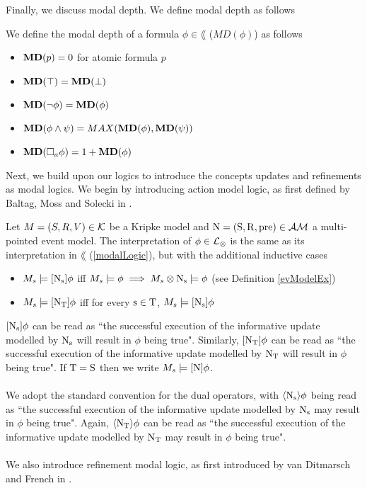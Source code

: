 Finally, we discuss modal depth.
We define modal depth as follows
\begin{defn} \label{modalDepth}
We define the modal depth of a formula $\phi \in \lang$ ($MD(\phi)$) as follows
\begin{itemize}
	\item ${\bf MD}(p) = 0$ for atomic formula $p$
	\item ${\bf MD}(\top) = {\bf MD}(\bot)$
	\item ${\bf MD}(\neg \phi) = {\bf MD}(\phi)$
	\item ${\bf MD}(\phi \land \psi) = MAX({\bf MD}(\phi), {\bf MD}(\psi))$
	\item ${\bf MD}(\Box_a \phi) = 1 + {\bf MD}(\phi)$
\end{itemize}
\end{defn}

Next, we build upon our logics to introduce the concepts updates and refinements as modal logics.
We begin by introducing action model logic, as first defined by Baltag, Moss and Solecki in
\cite{baltag1998lpa}.

\begin{defn} \label{actModelLogic}
Let $M = (S, R, V) \in \mathcal{K}$ be a Kripke model and $ \mathrm{N
  = (S, R, pre)}  \in
\mathcal{AM}$ a multi-pointed event model.
The interpretation of $\phi \in \mathcal{L}_{\otimes}$ is the same as its interpretation in $\lang$
(\ref{modalLogic}), but with the additional
inductive cases
\begin{itemize}
	\item $M_s \models [{ \mathrm{N_s} }] \phi$ iff $M_s \models
  \phi \implies M_s \otimes  \mathrm{N_s}  \models
	\phi$ (see Definition \ref{evModelEx})
	\item $M_s \models [{ \mathrm{N_T} }] \phi$ iff for every $ \mathrm{s
    \in T} $, $M_s \models [{ \mathrm{N_s} }] \phi$ 
\end{itemize}
\end{defn}
$[{ \mathrm{N_s} }] \phi$ can be read as ``the successful execution of the informative update modelled by
$ \mathrm{N_s} $ will result in $\phi$ being true".
Similarly, $[{ \mathrm{N_T} }] \phi$ can be read as ``the successful execution of the informative update
modelled by $ \mathrm{N_T} $ will result in $\phi$ being true".
If $ \mathrm{T = S} $ then we write $M_s \models [{ \mathrm{N} }] \phi$.\\
\\
We adopt the standard convention for the dual operators, with $\langle {
   \ensuremath{ \mathrm{N_s} }  } \rangle \phi$ being
read as ``the successful execution of the informative update modelled by
$ \mathrm{N_s} $ may result in
$\phi$ being true".
Again, $\langle {  \ensuremath{ \mathrm{N_T} }  } \rangle \phi$ can be read as ``the successful execution of the informative
update modelled by $ \mathrm{N_T} $ may result in $\phi$ being true".\\
\\
We also introduce refinement modal logic, as first introduced by van Ditmarsch and French in
\cite{van2009simulation}.

